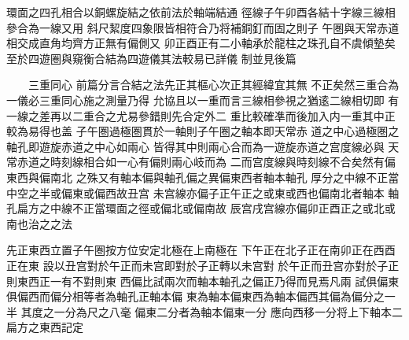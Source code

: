 \begin{正文}
環面之四孔相合以銅螺旋結之依前法於軸端結通
徑線子午卯酉各結十字線三線相參合為一線又用
斜尺絜度四象限皆相符合乃将補銅釘而固之則子
午圏與天常赤道相交成直角均齊方正無有偏側又
卯正酉正有二小軸承於龍柱之珠孔自不虞傾墊矣
至於四遊圏與窺衡合結為四遊儀其法較易已詳儀
制並見後篇
\par
　　三重同心
前篇分言合結之法先正其樞心次正其經緯宜其無
不正矣然三重合為一儀必三重同心施之測量乃得
允協且以一重而言三線相參視之猶逺二線相切即
有一線之差再以二重合之尤易參錯則先合定外二
重比較確凖而後加入内一重其中正較為易得也盖
子午圏過極圏貫於一軸則子午圈之軸本即天常赤
道之中心過極圏之軸孔即遊旋赤道之中心如兩心
皆得其中則兩心合而為一遊旋赤道之宫度線必與
天常赤道之時刻線相合如一心有偏則兩心岐而為
二而宫度線與時刻線不合矣然有偏東西與偏南北
之殊又有軸本偏與軸孔偏之異偏東西者軸本軸孔
厚分之中線不正當中空之半或偏東或偏西故丑宫
未宫線亦偏子正午正之或東或西也偏南北者軸本
軸孔扁方之中線不正當環面之徑或偏北或偏南故
辰宫戌宫線亦偏卯正酉正之或北或南也治之之法
\par
先正東西立置子午圏按方位安定北極在上南極在
下午正在北子正在南卯正在西酉正在東
設以丑宫對於午正而未宫即對於子正轉以未宫對
於午正而丑宫亦對於子正則東西正一有不對則東
西偏比試兩次而軸本軸孔之偏正乃得而見焉凡兩
試俱偏東俱偏西而偏分相等者為軸孔正軸本偏
東為軸本偏東西為軸本偏西其偏為偏分之一半
其度之一分為尺之八毫
偏東二分者為軸本偏東一分
應向西移一分将上下軸本二扁方之東西記定
\par

\end{正文}
